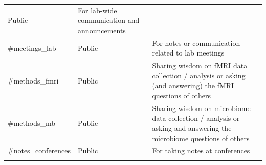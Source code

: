 \documentclass[]{book}
\begin{document}
\begin{longtable}[]{@{}lll@{}}
\begin{minipage}[t]{0.04\columnwidth}
Public\strut
\end{minipage} & \begin{minipage}[t]{0.70\columnwidth}\raggedright
For lab-wide communication and announcements\strut
\end{minipage}\tabularnewline
\begin{minipage}[t]{0.18\columnwidth}\raggedright
\#meetings\_lab\strut
\end{minipage} & \begin{minipage}[t]{0.04\columnwidth}\raggedright
Public\strut
\end{minipage} & \begin{minipage}[t]{0.70\columnwidth}\raggedright
For notes or communication related to lab meetings\strut
\end{minipage}\tabularnewline
\begin{minipage}[t]{0.18\columnwidth}\raggedright
\#methods\_fmri\strut
\end{minipage} & \begin{minipage}[t]{0.04\columnwidth}\raggedright
Public\strut
\end{minipage} & \begin{minipage}[t]{0.70\columnwidth}\raggedright
Sharing wisdom on fMRI data collection / analysis or asking (and answering) the fMRI questions of others\strut
\end{minipage}\tabularnewline
\begin{minipage}[t]{0.18\columnwidth}\raggedright
\#methods\_mb\strut
\end{minipage} & \begin{minipage}[t]{0.04\columnwidth}\raggedright
Public\strut
\end{minipage} & \begin{minipage}[t]{0.70\columnwidth}\raggedright
Sharing wisdom on microbiome data collection / analysis or asking and answering the microbiome questions of others\strut
\end{minipage}\tabularnewline
\begin{minipage}[t]{0.18\columnwidth}\raggedright
\#notes\_conferences\strut
\end{minipage} & \begin{minipage}[t]{0.04\columnwidth}\raggedright
Public\strut
\end{minipage} & \begin{minipage}[t]{0.70\columnwidth}\raggedright
For taking notes at conferences\strut
\end{minipage}\tabularnewline
\begin{minipage}[t]{0.18\columnwidth}\raggedright

\end{minipage}
\end{longtable}
\end{document}
